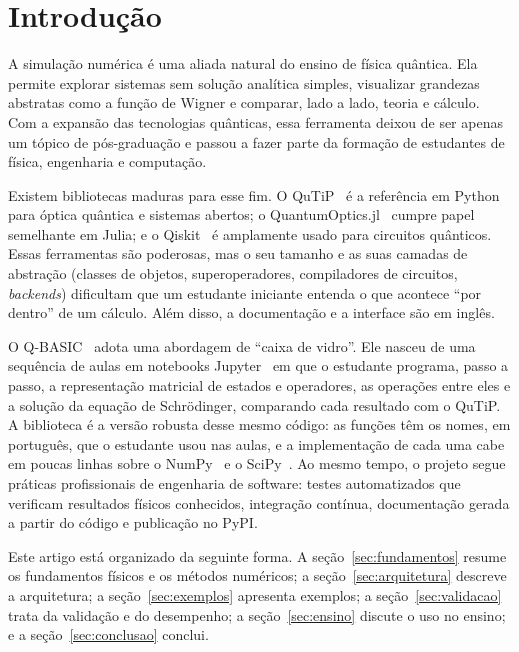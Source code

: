 \documentclass[11pt,a4paper]{article}
\newcommand{\qbasic}{\textsc{Q-BASIC}}
\begin{document}
\section{Introdução}

A simulação numérica é uma aliada natural do ensino de física quântica. Ela permite
explorar sistemas sem solução analítica simples, visualizar grandezas abstratas como a
função de Wigner e comparar, lado a lado, teoria e cálculo. Com a expansão das tecnologias
quânticas, essa ferramenta deixou de ser apenas um tópico de pós-graduação e passou a
fazer parte da formação de estudantes de física, engenharia e computação.

Existem bibliotecas maduras para esse fim. O QuTiP~\cite{johansson2012qutip,johansson2013qutip2}
é a referência em Python para óptica quântica e sistemas abertos; o
QuantumOptics.jl~\cite{kramer2018quantumoptics} cumpre papel semelhante em Julia; e o
Qiskit~\cite{javadi2024qiskit} é amplamente usado para circuitos quânticos. Essas
ferramentas são poderosas, mas o seu tamanho e as suas camadas de abstração (classes de
objetos, superoperadores, compiladores de circuitos, \emph{backends}) dificultam que um
estudante iniciante entenda o que acontece ``por dentro'' de um cálculo. Além disso, a
documentação e a interface são em inglês.

O \qbasic~\cite{qbasic2026} adota uma abordagem de ``caixa de vidro''. Ele nasceu de uma
sequência de aulas em notebooks Jupyter~\cite{kluyver2016jupyter} em que o estudante
programa, passo a passo, a representação matricial de estados e operadores, as operações
entre eles e a solução da equação de Schrödinger, comparando cada resultado com o
QuTiP. A biblioteca é a versão robusta desse mesmo código: as funções têm os nomes, em
português, que o estudante usou nas aulas, e a implementação de cada uma cabe em poucas
linhas sobre o NumPy~\cite{harris2020numpy} e o SciPy~\cite{virtanen2020scipy}. Ao mesmo
tempo, o projeto segue práticas profissionais de engenharia de software: testes
automatizados que verificam resultados físicos conhecidos, integração contínua,
documentação gerada a partir do código e publicação no PyPI.

Este artigo está organizado da seguinte forma. A seção~\ref{sec:fundamentos} resume os
fundamentos físicos e os métodos numéricos; a seção~\ref{sec:arquitetura} descreve a
arquitetura; a seção~\ref{sec:exemplos} apresenta exemplos; a
seção~\ref{sec:validacao} trata da validação e do desempenho; a
seção~\ref{sec:ensino} discute o uso no ensino; e a seção~\ref{sec:conclusao} conclui.
\end{document}
